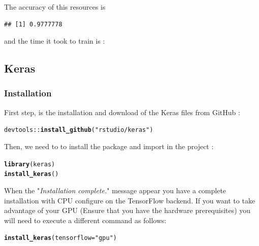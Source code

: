 \documentclass[letter]{article}\usepackage[]{graphicx}\usepackage[]{color}
\makeatletter
\newcommand{\hlstr}[1]{\textcolor[rgb]{0.192,0.494,0.8}{#1}}%
\newcommand{\hlopt}[1]{\textcolor[rgb]{0,0,0}{#1}}%
\newcommand{\hlstd}[1]{\textcolor[rgb]{0.345,0.345,0.345}{#1}}%
\newcommand{\hlkwc}[1]{\textcolor[rgb]{0.333,0.667,0.333}{#1}}%
\newcommand{\hlkwd}[1]{\textcolor[rgb]{0.737,0.353,0.396}{\textbf{#1}}}%
\newenvironment{kframe}{%
 \def\at@end@of@kframe{}%
 \ifinner\ifhmode%
  \def\at@end@of@kframe{\end{minipage}}%
  \begin{minipage}{\columnwidth}%
 \fi\fi%
 \def\FrameCommand##1{\hskip\@totalleftmargin \hskip-\fboxsep
 \colorbox{shadecolor}{##1}\hskip-\fboxsep
     \hskip-\linewidth \hskip-\@totalleftmargin \hskip\columnwidth}%
 \MakeFramed {\advance\hsize-\width
   \@totalleftmargin\z@ \linewidth\hsize
   \@setminipage}}%
 {\par\unskip\endMakeFramed%
 \at@end@of@kframe}
\newenvironment{knitrout}{}{} %
\makeatother
\begin{document}
The accuracy of this resources is
\begin{knitrout}
\color{fgcolor}\begin{kframe}
\begin{verbatim}
## [1] 0.9777778
\end{verbatim}
\end{kframe}
\end{knitrout}
and the time it took to train is :
\begin{knitrout}
\color{fgcolor}\begin{kframe}


{\ttfamily\noindent\bfseries\color{errorcolor}{\#\# Error in eval(expr, envir, enclos): object 'time\_fnn\_neuralnet' not found}}\end{kframe}
\end{knitrout}

\subsection{Keras}
\subsubsection{Installation}
First step, is the installation and download of the Keras files from GitHub :
\begin{knitrout}
\color{fgcolor}\begin{kframe}
\begin{alltt}
\hlstd{devtools}\hlopt{::}\hlkwd{install_github}\hlstd{(}\hlstr{"rstudio/keras"}\hlstd{)}
\end{alltt}
\end{kframe}
\end{knitrout}
Then, we need to to install the package and import in the project :
\begin{knitrout}
\color{fgcolor}\begin{kframe}
\begin{alltt}
\hlkwd{library}\hlstd{(keras)}
\hlkwd{install_keras}\hlstd{()}
\end{alltt}
\end{kframe}
\end{knitrout}
When the "\textit{Installation complete.}" message appear you have a complete installation with CPU configure on the TensorFlow backend.
If you want to take advantage of your GPU (Ensure that you have the hardware prerequisites) you will need to execute a different command as follows:
\begin{knitrout}
\color{fgcolor}\begin{kframe}
\begin{alltt}
\hlkwd{install_keras}\hlstd{(}\hlkwc{tensorflow} \hlstd{=} \hlstr{"gpu"}\hlstd{)}
\end{alltt}
\end{kframe}
\end{knitrout}
\end{document}
